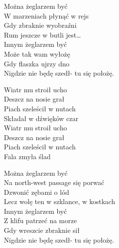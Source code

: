 \begin{text}
    Można żeglarzem być\\
    W marzeniach płynąć w rejs\\
    Gdy zbraknie wyobraźni\\
    Rum jeszcze w butli jest…\\
    Innym żeglarzem być\\
    Może tak wam wyłożę\\
    Gdy flaszka ujrzy dno\\
    Nigdzie nie będę szedł- tu się położę.

    Wiatr mu stroił ucho\\
    Deszcz na nosie grał\\
    Piach szeleścił w nutach\\
    Składał w dźwięków czar\\
    Wiatr mu stroił ucho\\
    Deszcz na nosie grał\\
    Piach szeleścił w nutach\\
    Fala zmyła ślad

    Można żeglarzem być\\
    Na north-west passage się porwać\\
    Dzwonić zębami o lód\\
    Lecz wolę ten w szklance, w kostkach\\
    Innym żeglarzem być\\
    Z klifu patrzeć na morze\\
    Gdy wreszcie zbraknie sił\\
    Nigdzie nie będę szedł- tu się położę.
\end{text}
\begin{chord}

\end{chord}
